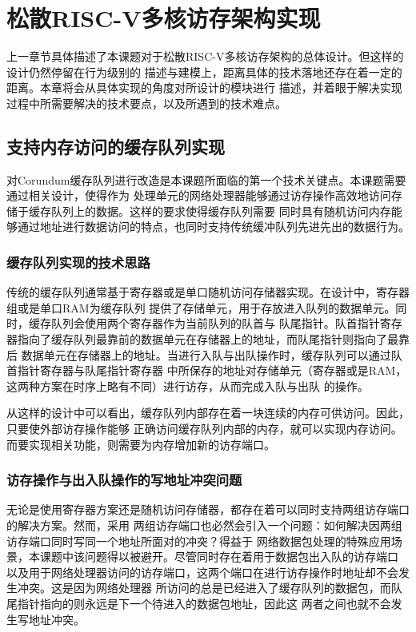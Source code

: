\section{松散RISC-V多核访存架构实现}

上一章节具体描述了本课题对于松散RISC-V多核访存架构的总体设计。但这样的设计仍然停留在行为级别的
描述与建模上，距离具体的技术落地还存在着一定的距离。本章将会从具体实现的角度对所设计的模块进行
描述，并着眼于解决实现过程中所需要解决的技术要点，以及所遇到的技术难点。

\subsection{支持内存访问的缓存队列实现}

对Corundum缓存队列进行改造是本课题所面临的第一个技术关键点。本课题需要通过相关设计，使得作为
处理单元的网络处理器能够通过访存操作高效地访问存储于缓存队列上的数据。这样的要求使得缓存队列需要
同时具有随机访问内存能够通过地址进行数据访问的特点，也同时支持传统缓冲队列先进先出的数据行为。

\subsubsection{缓存队列实现的技术思路}

传统的缓存队列通常基于寄存器或是单口随机访问存储器实现。在设计中，寄存器组或是单口RAM为缓存队列
提供了存储单元，用于存放进入队列的数据单元。同时，缓存队列会使用两个寄存器作为当前队列的队首与
队尾指针。队首指针寄存器指向了缓存队列最靠前的数据单元在存储器上的地址，而队尾指针则指向了最靠后
数据单元在存储器上的地址。当进行入队与出队操作时，缓存队列可以通过队首指针寄存器与队尾指针寄存器
中所保存的地址对存储单元（寄存器或是RAM，这两种方案在时序上略有不同）进行访存，从而完成入队与出队
的操作。

从这样的设计中可以看出，缓存队列内部存在着一块连续的内存可供访问。因此，只要使外部访存操作能够
正确访问缓存队列内部的内存，就可以实现内存访问。而要实现相关功能，则需要为内存增加新的访存端口。

\subsubsection{访存操作与出入队操作的写地址冲突问题}

无论是使用寄存器方案还是随机访问存储器，都存在着可以同时支持两组访存端口的解决方案。然而，采用
两组访存端口也必然会引入一个问题：如何解决因两组访存端口同时写同一个地址所面对的冲突？得益于
网络数据包处理的特殊应用场景，本课题中该问题得以被避开。尽管同时存在着用于数据包出入队的访存端口
以及用于网络处理器访问的访存端口，这两个端口在进行访存操作时地址却不会发生冲突。这是因为网络处理器
所访问的总是已经进入了缓存队列的数据包，而队尾指针指向的则永远是下一个待进入的数据包地址，因此这
两者之间也就不会发生写地址冲突。


